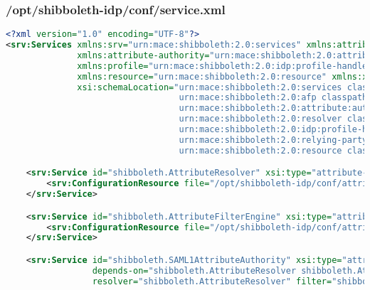 \subsubsection{/opt/shibboleth-idp/conf/service.xml}
\begin{lstlisting}[language=xml]
<?xml version="1.0" encoding="UTF-8"?>
<srv:Services xmlns:srv="urn:mace:shibboleth:2.0:services" xmlns:attribute-afp="urn:mace:shibboleth:2.0:afp"
              xmlns:attribute-authority="urn:mace:shibboleth:2.0:attribute:authority" xmlns:attribute-resolver="urn:mace:shibboleth:2.0:resolver"
              xmlns:profile="urn:mace:shibboleth:2.0:idp:profile-handler" xmlns:relyingParty="urn:mace:shibboleth:2.0:relying-party"
              xmlns:resource="urn:mace:shibboleth:2.0:resource" xmlns:xsi="http://www.w3.org/2001/XMLSchema-instance"
              xsi:schemaLocation="urn:mace:shibboleth:2.0:services classpath:/schema/shibboleth-2.0-services.xsd
                                  urn:mace:shibboleth:2.0:afp classpath:/schema/shibboleth-2.0-afp.xsd
                                  urn:mace:shibboleth:2.0:attribute:authority classpath:/schema/shibboleth-2.0-attribute-authority.xsd
                                  urn:mace:shibboleth:2.0:resolver classpath:/schema/shibboleth-2.0-attribute-resolver.xsd
                                  urn:mace:shibboleth:2.0:idp:profile-handler classpath:/schema/shibboleth-2.0-idp-profile-handler.xsd
                                  urn:mace:shibboleth:2.0:relying-party classpath:/schema/shibboleth-2.0-relying-party.xsd
                                  urn:mace:shibboleth:2.0:resource classpath:/schema/shibboleth-2.0-resource.xsd">

    <srv:Service id="shibboleth.AttributeResolver" xsi:type="attribute-resolver:ShibbolethAttributeResolver" configurationResourcePollingFrequency="PT5M">
        <srv:ConfigurationResource file="/opt/shibboleth-idp/conf/attribute-resolver.xml" xsi:type="resource:FilesystemResource"/>
    </srv:Service>

    <srv:Service id="shibboleth.AttributeFilterEngine" xsi:type="attribute-afp:ShibbolethAttributeFilteringEngine" configurationResourcePollingFrequency="PT5M">
        <srv:ConfigurationResource file="/opt/shibboleth-idp/conf/attribute-filter.xml" xsi:type="resource:FilesystemResource"/>
    </srv:Service>

    <srv:Service id="shibboleth.SAML1AttributeAuthority" xsi:type="attribute-authority:SAML1AttributeAuthority"
                 depends-on="shibboleth.AttributeResolver shibboleth.AttributeFilterEngine"
                 resolver="shibboleth.AttributeResolver" filter="shibboleth.AttributeFilterEngine"/>


\end{lstlisting}
